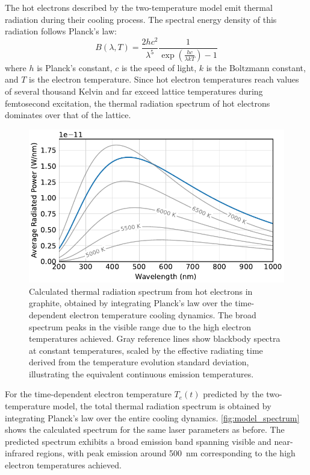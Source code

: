 \documentclass[
	parskip=half,
	a4paper,
]{scrarticle}
\begin{document}
The hot electrons described by the two-temperature model emit thermal radiation during their cooling process. The spectral energy density of this radiation follows Planck's law:
\begin{equation}
B(\lambda, T) = \frac{2hc^2}{\lambda^5} \frac{1}{\exp\left(\frac{hc}{\lambda kT}\right) - 1}
\end{equation}
where $h$ is Planck's constant, $c$ is the speed of light, $k$ is the Boltzmann constant, and $T$ is the electron temperature. Since hot electron temperatures reach values of several thousand Kelvin and far exceed lattice temperatures during femtosecond excitation, the thermal radiation spectrum of hot electrons dominates over that of the lattice. 

\begin{figure}[b]
    \centering
    \includegraphics{../analysis/figures/model spectrum.pdf}
    \caption{Calculated thermal radiation spectrum from hot electrons in graphite, obtained by integrating Planck's law over the time-dependent electron temperature cooling dynamics. The broad spectrum peaks in the visible range due to the high electron temperatures achieved. Gray reference lines show blackbody spectra at constant temperatures, scaled by the effective radiating time derived from the temperature evolution standard deviation, illustrating the equivalent continuous emission temperatures.}
    \label{fig:model_spectrum}
\end{figure}
For the time-dependent electron temperature $T_e(t)$ predicted by the two-temperature model, the total thermal radiation spectrum is obtained by integrating Planck's law over the entire cooling dynamics. \autoref{fig:model_spectrum} shows the calculated spectrum for the same laser parameters as before. The predicted spectrum exhibits a broad emission band spanning visible and near-infrared regions, with peak emission around \SI{500}{nm} corresponding to the high electron temperatures achieved.
\end{document}
